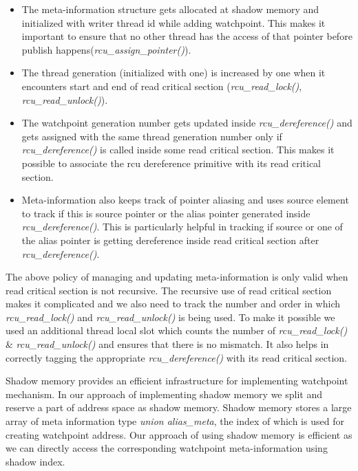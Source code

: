 \begin{itemize}
    	\item	The meta-information structure gets allocated at shadow memory and initialized with writer thread id while adding watchpoint. This makes it important to ensure that no other thread has the access of that pointer before publish happens(\emph{rcu\_assign\_pointer()}). 
    	\item 	The thread generation (initialized with one) is increased by one when it encounters start and end of read critical section (\emph{rcu\_read\_lock()}, \emph{rcu\_read\_unlock()}).  
	\item 	The watchpoint generation number gets updated inside \emph{rcu\_dereference()} and gets assigned with the same thread generation number only if \emph{rcu\_dereference()} is called inside some read critical section. This makes it possible to associate the rcu dereference primitive with its read critical section.
	\item 	Meta-information also keeps track of pointer aliasing and uses source element to track if this is source pointer or the alias pointer generated inside \emph{rcu\_dereference()}. This is particularly helpful in tracking if source or one of the alias pointer is getting dereference inside read critical section after \emph{rcu\_dereference()}.
\end{itemize}

The above policy of managing and updating meta-information is only valid when read critical section is not recursive. The recursive use of read critical section makes it complicated and we also need to track the number and order in which \emph{rcu\_read\_lock()} and \emph{rcu\_read\_unlock()} is being used. To make it possible we used an additional thread local slot which counts the number of \emph{rcu\_read\_lock()} \& \emph{rcu\_read\_unlock()} and ensures that there is no mismatch. It also helps in correctly tagging the appropriate \emph{rcu\_dereference()} with its read critical section.

Shadow memory provides an efficient infrastructure for implementing watchpoint mechanism. In our approach of implementing shadow memory we split and reserve a part of address space as shadow memory. Shadow memory stores a large array of meta information type \emph{union alias\_meta}, the index of which is used for creating watchpoint address. Our approach of using shadow memory is efficient as we can directly access the corresponding watchpoint meta-information using shadow index. 

